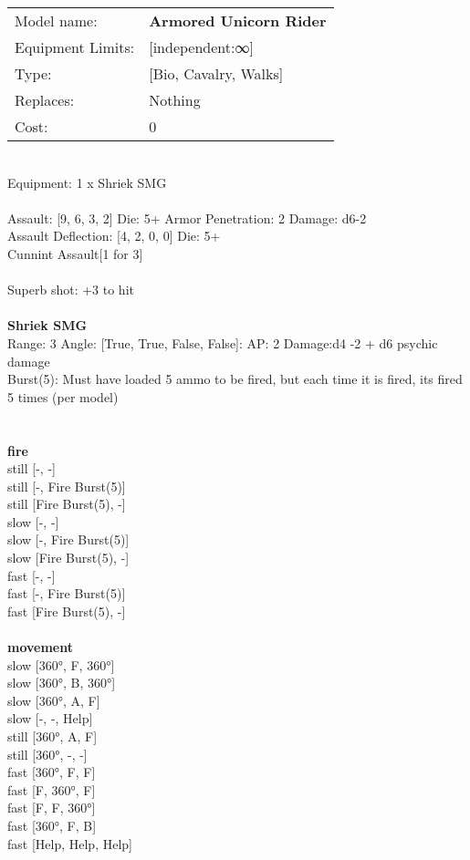 \noindent
\begin{tabular}{ll}
Model name: &{\bf Armored Unicorn Rider } \\
Equipment Limits: &[independent:∞] \\
Type: &[Bio, Cavalry, Walks] \\
Replaces: &Nothing \\
Cost: & 0\\
\end{tabular}
\ \\
Equipment: 1 x Shriek SMG \\
\ \\
Assault: [9, 6, 3, 2] Die: 5+ Armor Penetration: 2 Damage: d6-2 \\
Assault Deflection: [4, 2, 0, 0] Die: 5+\\
\indent Cunnint Assault[1 for 3]\\ 
 
\ \\
Superb shot: +3 to hit\\ 

\ \\
{\bf Shriek SMG } \\



Range: 3  Angle: [True, True, False, False]: AP: 2 Damage:d4 -2 + d6 psychic damage \\
Burst(5): Must have loaded 5 ammo to be fired, but each time it is fired, its fired 5 times (per model)\\ 




 
\ \\



\ \\ {\bf fire } \\
still [-, -] \\
still [-, Fire Burst(5)] \\
still [Fire Burst(5), -] \\
slow [-, -] \\
slow [-, Fire Burst(5)] \\
slow [Fire Burst(5), -] \\
fast [-, -] \\
fast [-, Fire Burst(5)] \\
fast [Fire Burst(5), -] \\
\ \\ {\bf movement } \\
slow [360°, F, 360°] \\
slow [360°, B, 360°] \\
slow [360°, A, F] \\
slow [-, -, Help] \\
still [360°, A, F] \\
still [360°, -, -] \\
fast [360°, F, F] \\
fast [F, 360°, F] \\
fast [F, F, 360°] \\
fast [360°, F, B] \\
fast [Help, Help, Help] \\



